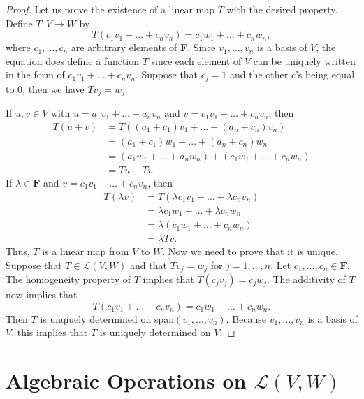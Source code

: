 \documentclass[11pt]{article}
\begin{document}
    \begin{proof}
        Let us prove the existence of a linear map $T$ with the desired property. Define \(T:V \rightarrow W\) by \[T(c_1 v_1 + \dots + c_n v_n) = c_1 w_1 + \dots + c_n w_n,\] where \(c_1, \dots, c_n\) are arbitrary elements of \textbf{F}. Since \(v_1, \dots, v_n\) is a basis of $V$, the equation does define a function $T$ since each element of $V$ can be uniquely written in the form of \(c_1 v_1 + \dots + c_n v_n\). Suppose that \(c_j = 1\) and the other $c$'s being equal to 0, then we have \(Tv_j = w_j\).

        \vspace{1em}
        
        If \(u,v \in V\) with \(u = a_1 v_1 + \dots + a_n v_n\) and \(v = c_1 v_1 + \dots + c_n v_n\), then 
        \begin{align*}
            T(u + v) &= T((a_1 + c_1)v_1 + \dots + (a_n + c_n)v_n) \\
                     &= (a_1 + c_1)w_1 + \dots + (a_n + c_n) w_n \\
                     &= (a_1 w_1 + \dots + a_n w_n) + (c_1 w_1 + \dots + c_n w_n) \\
                     &= Tu + Tv.
        \end{align*}
        If \(\lambda \in \textbf{F}\) and \(v = c_1 v_1 + \dots + c_n v_n\), then
        \begin{align*}
            T(\lambda v) &= T(\lambda c_1 v_1 + \dots + \lambda c_n v_n) \\
                         &= \lambda c_1 w_1 + \dots + \lambda c_n w_n \\
                         &= \lambda (c_1 w_1 + \dots + c_n w_n) \\
                         &= \lambda Tv.
        \end{align*}
        Thus, $T$ is a linear map from $V$ to $W$. Now we need to prove that it is unique. Suppose that \(T \in \mathcal{L}(V,W)\) and that \(Tv_j = w_j\) for \(j = 1, \dots, n\). Let \(c_1, \dots, c_n \in \textbf{F}\). The homogeneity property of $T$ implies that \(T(c_j v_j) = c_j w_j\). The additivity of $T$ now implies that \[T(c_1 v_1 + \dots + c_n v_n) = c_1 w_1 + \dots + c_n w_n.\] Then $T$ is unqiuely determined on span\((v_1, \dots,v_n)\). Because \(v_1, \dots, v_n\) is a basis of $V$, this implies that $T$ is uniquely determined on $V$.
    \end{proof}


    \section{Algebraic Operations on \(\mathcal{L}(V,W)\)}
\end{document}
